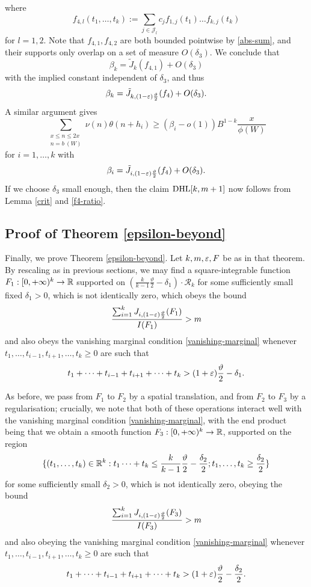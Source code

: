 where
$$ f_{4,l}(t_1,\dots,t_k) :=\sum_{j \in {\mathcal J}_l} c_j f_{1,j}(t_1) \dots f_{k,j}(t_k)$$
for $l=1,2$.  Note that $f_{4,1}, f_{4,2}$ are both bounded pointwise by \eqref{abs-sum}, and their supports only overlap on a set of measure $O( \delta_3 )$.  We conclude that
$$ \beta_k = \tilde J_k( f_{4,1} ) + O(\delta_3)$$
with the implied constant independent of $\delta_3$, and thus
$$ \beta_k = \tilde J_{k, (1-\varepsilon) \frac{\vartheta}{2}}( f_4 ) + O(\delta_3).$$
A similar argument gives
$$ 
 \sum_{\substack{x \leq n \leq 2x\\ n = b\ (W)}} \nu(n) \theta(n+h_i) \geq (\beta_i - o(1)) B^{1-k} \frac{x}{\phi(W)}$$
for $i=1,\dots,k$ with
$$ \beta_i = \tilde J_{i, (1-\varepsilon) \frac{\vartheta}{2}}( f_4 ) + O(\delta_3).$$
If we choose $\delta_3$ small enough, then the claim $\operatorname*{DHL}[k,m+1]$ now follows from Lemma \ref{crit} and \eqref{f4-ratio}.

\subsection{Proof of Theorem \ref{epsilon-beyond}}\label{beyond-sec}

Finally, we prove Theorem \ref{epsilon-beyond}. Let $k, m, \varepsilon, F$ be as in that theorem.  By rescaling as in previous sections, we may find
a square-integrable function $F_1: [0,+\infty)^k \to \mathbb{R}$ supported on 
$(\frac{k}{k-1} \frac{\vartheta}{2}-\delta_1) \cdot {\mathcal R}_k$ for some sufficiently small fixed $\delta_1 > 0$, which is not identically zero, which obeys the bound
$$
\frac{\sum_{i=1}^k J_{i,(1-\varepsilon) \frac{\vartheta}{2}}(F_1)}{I(F_1)} > m
$$
and also obeys the vanishing marginal condition \eqref{vanishing-marginal} whenever $t_1,\dots,t_{i-1},t_{i+1},\dots,t_k \geq 0$ are such that
$$ t_1+\dots+t_{i-1}+t_{i+1}+\dots+t_k > (1+\varepsilon) \frac{\vartheta}{2} - \delta_1.$$

As before, we pass from $F_1$ to $F_2$ by a spatial translation, and from $F_2$ to $F_3$ by a regularisation; crucially, we note that both of these operations interact well with the vanishing marginal condition \eqref{vanishing-marginal}, with the end product being that we obtain a smooth function $F_3: [0,+\infty)^k \to \mathbb{R}$, supported on the region
$$
\{ (t_1,\dots,t_k) \in \mathbb{R}^k: t_1 \dots + t_k \leq \frac{k}{k-1} \frac{\vartheta}{2}-\frac{\delta_2}{2}; t_1,\dots,t_k \geq \frac{\delta_2}{2} \}$$
for some sufficiently small $\delta_2>0$, which is not identically zero, obeying the bound
$$
\frac{\sum_{i=1}^k J_{i,(1-\varepsilon) \frac{\vartheta}{2}}(F_3)}{I(F_3)} > m
$$
and also obeying the vanishing marginal condition \eqref{vanishing-marginal} whenever
$t_1,\dots,t_{i-1},t_{i+1},\dots,t_k \geq 0$ are such that
$$ t_1+\dots+t_{i-1}+t_{i+1}+\dots+t_k > (1+\varepsilon) \frac{\vartheta}{2} - \frac{\delta_2}{2}.$$

